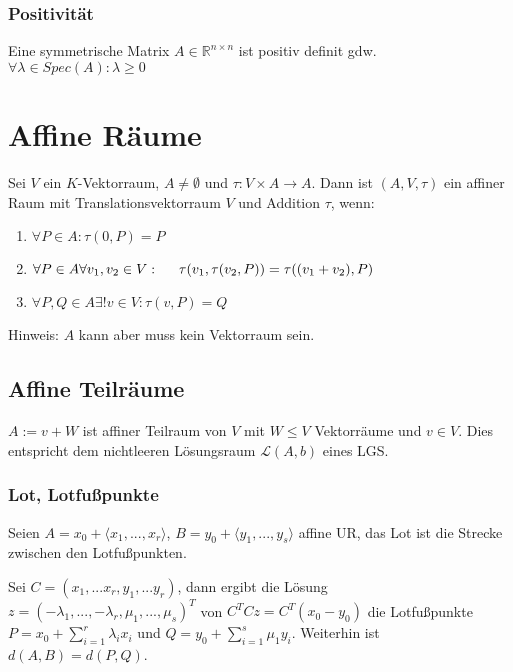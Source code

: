 \subsubsection*{Positivität}

Eine symmetrische Matrix $A \in \mathbb{R}^{n \times n}$ ist positiv definit gdw. $\forall \lambda \in Spec(A) : \lambda \geq 0$

\section*{Affine Räume}

Sei $V$ ein $K$-Vektorraum, $A \neq \emptyset$ und $\tau : V \times A \rightarrow A$. Dann ist $(A, V, \tau)$ ein affiner Raum  mit Translationsvektorraum $V$ und Addition $\tau$, wenn:

\begin{enumerate}[label=(\alph*)]
	\item $\forall P \in A : \tau(0, P) = P$
	\item $\forall P \in A \forall v_1, v_2 \in V : \\ \hspace*{5mm} \tau(v_1, \tau(v_2, P)) = \tau((v_1 + v_2), P)$
	\item $\forall P, Q \in A \exists ! v \in V : \tau(v, P) = Q$
\end{enumerate}

Hinweis: $A$ kann aber muss kein Vektorraum sein.

\subsection*{Affine Teilräume}

$A := v + W$ ist affiner Teilraum von $V$ mit $W \leq V$ Vektorräume und $v \in V$. Dies entspricht dem nichtleeren Lösungsraum $\mathcal{L}(A,b)$ eines LGS.

\subsubsection*{Lot, Lotfußpunkte}

Seien $A=x_0+\langle x_1,...,x_r \rangle$, $B=y_0+\langle y_1,...,y_s\rangle$ affine UR, das Lot ist die Strecke zwischen den Lotfußpunkten.

Sei $C=(x_1,...x_r,y_1,...y_r)$, dann ergibt die Lösung $z=(-\lambda_1,...,-\lambda_r,\mu_1,...,\mu_s)^T$ von $C^TCz=C^T(x_0-y_0)$ die Lotfußpunkte $P=x_0+\sum_{i=1}^r \lambda_i x_i$ und $Q=y_0+\sum_{i=1}^s \mu_1 y_i$. Weiterhin ist $d(A, B)=d(P,Q)$.


